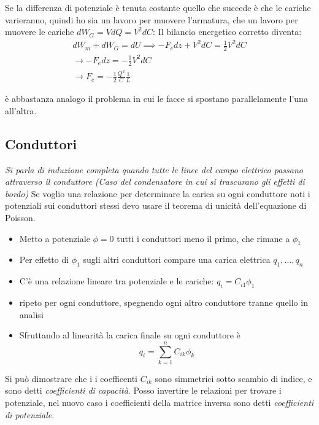 \documentclass[a4paper]{scrarticle}
\begin{document}
Se la differenza di potenziale è tenuta costante quello che succede è che le cariche varieranno, quindi ho sia un lavoro per muovere l'armatura, che un lavoro per muovere le cariche $dW_G = VdQ = V^2 dC$:
Il bilancio energetico corretto diventa:
\begin{gather*}
    dW_m + dW_G = dU \implies -F_edz + V^2dC = \frac{1}{2}V^2dC\\
    \to -F_e dz = -\frac{1}{2}V^2dC\\
    \to F_e = -\frac{1}{2}\frac{Q^2}{C}\frac{1}{L}
\end{gather*}

è abbastanza analogo il problema in cui le facce si spostano parallelamente l'una all'altra.

\subsection{Conduttori}

\emph{Si parla di induzione completa quando tutte le linee del campo elettrico passano attraverso il conduttore (Caso del condensatore in cui si trascurano gli effetti di bordo)}
Se voglio una relazione per determinare la carica su ogni conduttore noti i potenziali sui conduttori stessi devo usare il teorema di unicità dell'equazione di Poisson.

\begin{itemize}
    \item Metto a potenziale $ \phi = 0 $ tutti i conduttori meno il primo, che rimane a $\phi_1$
    \item Per effetto di $\phi_1$ sugli altri conduttori compare una carica elettrica $q_1, \dots, q_n$
    \item C'è una relazione lineare tra potenziale e le cariche: $q_i = C_{i1} \phi_1$
    \item ripeto per ogni conduttore, spegnendo ogni altro conduttore tranne quello in analisi
    \item Sfruttando al linearità la carica finale su ogni conduttore è 
    \begin{equation}
        q_i = \sum_{k=1}^{n}C_{ik} \phi_k
    \end{equation}
\end{itemize}

Si può dimostrare che i i coefficenti $C_{ik}$ sono simmetrici sotto scambio di indice, e sono detti \emph{coefficienti di capacità}.
Posso invertire le relazioni per trovare i potenziale, nel nuovo caso i coefficienti della matrice inversa sono detti \emph{coefficienti di potenziale}.
\end{document}

